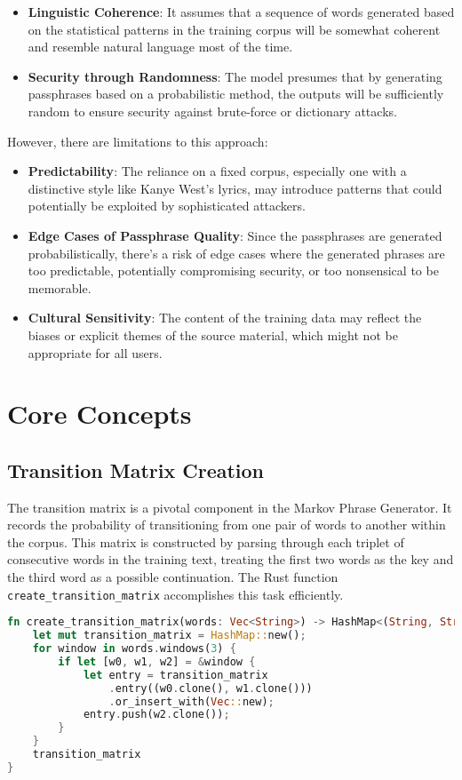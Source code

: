 \documentclass[a4paper,12pt]{article}
\begin{document}
\begin{itemize}
  \item \textbf{Linguistic Coherence}: It assumes that a sequence of words generated based on the statistical patterns in the training corpus will be somewhat coherent and resemble natural language most of the time.
  \item \textbf{Security through Randomness}: The model presumes that by generating passphrases based on a probabilistic method, the outputs will be sufficiently random to ensure security against brute-force or dictionary attacks.
\end{itemize}

However, there are limitations to this approach:

\begin{itemize}
  \item \textbf{Predictability}: The reliance on a fixed corpus, especially one with a distinctive style like Kanye West's lyrics, may introduce patterns that could potentially be exploited by sophisticated attackers.
  \item \textbf{Edge Cases of Passphrase Quality}: Since the passphrases are generated probabilistically, there's a risk of edge cases where the generated phrases are too predictable, potentially compromising security, or too nonsensical to be memorable.
  \item \textbf{Cultural Sensitivity}: The content of the training data may reflect the biases or explicit themes of the source material, which might not be appropriate for all users.
\end{itemize}

\section{Core Concepts}
\subsection{Transition Matrix Creation}
The transition matrix is a pivotal component in the Markov Phrase Generator. It records the probability of transitioning from one pair of words to another within the corpus. This matrix is constructed by parsing through each triplet of consecutive words in the training text, treating the first two words as the key and the third word as a possible continuation. The Rust function \texttt{create\_transition\_matrix} accomplishes this task efficiently.

\begin{lstlisting}[language=Rust, caption={Creating the Transition Matrix}]
fn create_transition_matrix(words: Vec<String>) -> HashMap<(String, String), Vec<String>> {
    let mut transition_matrix = HashMap::new();
    for window in words.windows(3) {
        if let [w0, w1, w2] = &window {
            let entry = transition_matrix
                .entry((w0.clone(), w1.clone()))
                .or_insert_with(Vec::new);
            entry.push(w2.clone());
        }
    }
    transition_matrix
}
\end{lstlisting}
\end{document}

